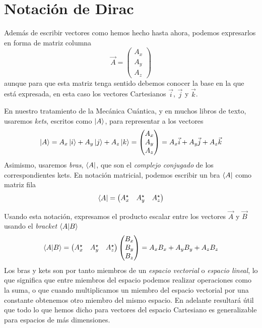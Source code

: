 \documentclass{tufte-handout}
\begin{document}
\section{Notación de Dirac}
Además de escribir vectores como hemos hecho hasta ahora, podemos expresarlos
en forma de matriz columna
\begin{equation}
    \vec{A} = \begin{pmatrix}
    A_x\\
    A_y\\
    A_z
    \end{pmatrix}
\end{equation}
aunque para que esta matriz tenga sentido debemos conocer la base en la que está expresada, en esta caso los vectores Cartesianos $\vec{i}$, 
$\vec{j}$ y $\vec{k}$.

En nuestro tratamiento de la Mecánica Cuántica, y en muchos libros de
texto, usaremos \textit{kets}, escritos como $\ket{A}$,
para representar a los vectores
\begin{equation}
    \ket{A} = A_x\ket{i} + A_y\ket{j} + A_z\ket{k} = \begin{pmatrix}
    A_x\\
    A_y\\
    A_z
    \end{pmatrix}=A_x\vec{i} + A_y\vec{j} + A_z\vec{k}
\end{equation}
Asimismo, usaremos \textit{bras}, $\bra{A}$, que son el \textit{complejo 
conjugado} de los correspondientes kets. En notación matricial,
podemos escribir un bra $\bra{A}$ como matriz fila
\begin{equation}
    \bra{A} = \begin{pmatrix}
    A_x^\star & A_y^\star & A_z^\star
    \end{pmatrix}
\end{equation}

Usando  esta notación, expresamos el producto escalar entre los vectores $\vec{A}$ y $\vec{B}$ usando el \textit{bracket} $\braket{A}{B}$
\begin{equation}
    \bra{A}\ket{B} = \begin{pmatrix}
    A_x^\star & A_y^\star & A_z^\star
    \end{pmatrix}
    \begin{pmatrix}
    B_x\\
    B_y\\
    B_z
    \end{pmatrix}=
    A_xB_x + A_yB_y + A_zB_z
\end{equation}
Los bras y kets son por tanto miembros de un \textit{espacio vectorial}
o \textit{espacio lineal}, lo que significa que entre miembros del
espacio podemos realizar operaciones como la suma, o que cuando multiplicamos
un miembro del espacio vectorial por una constante obtenemos otro miembro
del mismo espacio. En adelante resultará útil que todo lo que hemos
dicho para vectores del espacio Cartesiano es generalizable para 
espacios de más dimensiones.
\end{document}
